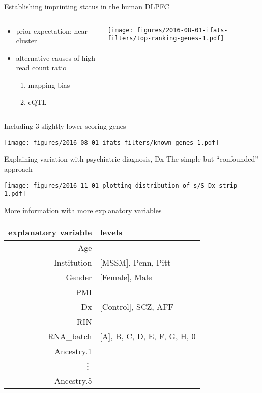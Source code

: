 \documentclass{beamer}
\begin{document}
\begin{frame}{Establishing imprinting status in the human DLPFC}
\begin{columns}[t]
\begin{column}{0.5\textwidth}
\begin{itemize}
\item prior expectation: near cluster
\item alternative causes of high read count ratio
\begin{enumerate}
\item mapping bias
\item eQTL
\end{enumerate}
\end{itemize}
\end{column}
\begin{column}{0.5\textwidth}

\texttt{[image: figures/2016-08-01-ifats-filters/top-ranking-genes-1.pdf]}
\end{column}
\end{columns}
\end{frame}

\begin{frame}{Including 3 slightly lower scoring genes}
\begin{center}
\texttt{[image: figures/2016-08-01-ifats-filters/known-genes-1.pdf]}
\end{center}
\end{frame}

\begin{frame}{Explaining variation with psychiatric diagnosis, Dx}
{The simple but ``confounded'' approach}
\begin{center}
\texttt{[image: figures/2016-11-01-plotting-distribution-of-s/S-Dx-strip-1.pdf]}
\end{center}
\end{frame}

\begin{frame}{More information with more explanatory variables}
\begin{table}[H]
\begin{center}
\begin{tabular}{r|l}
explanatory variable & levels\\
\hline
Age &  \\
Institution & [MSSM], Penn, Pitt\\
Gender & [Female], Male\\
PMI & \\
Dx & [Control], SCZ, AFF \\
RIN &  \\
RNA\_batch & [A], B, C, D, E, F, G, H, 0\\
Ancestry.1 & \\
\vdots & \\
Ancestry.5 &  \\
\end{tabular}
\end{center}
\end{table}
\end{frame}
\end{document}

